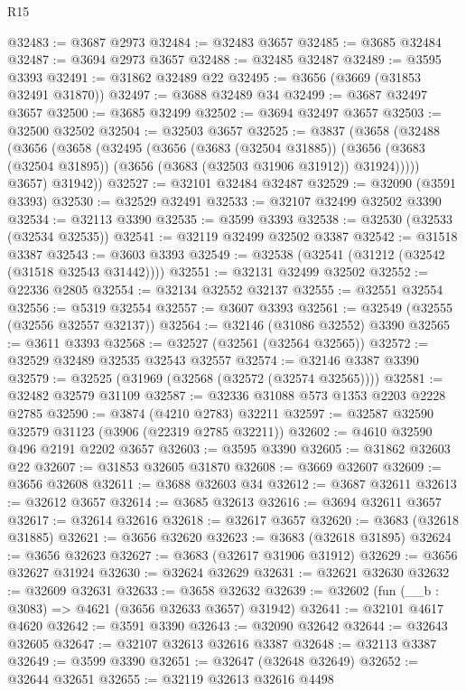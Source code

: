 \begin{lexlean}{R15}
\begin{coremodule}
@32483 := @3687 @2973
@32484 := @32483 @3657
@32485 := @3685 @32484
@32487 := @3694 @2973 @3657
@32488 := @32485 @32487
@32489 := @3595 @3393
@32491 := @31862 @32489 @22
@32495 := @3656 (@3669 (@31853 @32491 @31870))
@32497 := @3688 @32489 @34
@32499 := @3687 @32497 @3657
@32500 := @3685 @32499
@32502 := @3694 @32497 @3657
@32503 := @32500 @32502
@32504 := @32503 @3657
@32525 := @3837
    (@3658
      (@32488
        (@3656
          (@3658
            (@32495
              (@3656
                (@3683 (@32504 @31885))
                (@3656 (@3683 (@32504 @31895)) (@3656 (@3683 (@32503 @31906 @31912)) @31924)))))
          @3657)
        @31942))
@32527 := @32101 @32484 @32487
@32529 := @32090 (@3591 @3393)
@32530 := @32529 @32491
@32533 := @32107 @32499 @32502 @3390
@32534 := @32113 @3390
@32535 := @3599 @3393
@32538 := @32530 (@32533 (@32534 @32535))
@32541 := @32119 @32499 @32502 @3387
@32542 := @31518 @3387
@32543 := @3603 @3393
@32549 := @32538 (@32541 (@31212 (@32542 (@31518 @32543 @31442))))
@32551 := @32131 @32499 @32502
@32552 := @22336 @2805
@32554 := @32134 @32552 @32137
@32555 := @32551 @32554
@32556 := @5319 @32554
@32557 := @3607 @3393
@32561 := @32549 (@32555 (@32556 @32557 @32137))
@32564 := @32146 (@31086 @32552) @3390
@32565 := @3611 @3393
@32568 := @32527 (@32561 (@32564 @32565))
@32572 := @32529 @32489 @32535 @32543 @32557
@32574 := @32146 @3387 @3390
@32579 := @32525 (@31969 (@32568 (@32572 (@32574 @32565))))
@32581 := @32482 @32579 @31109
@32587 := @32336 @31088 @573 @1353 @2203 @2228 @2785
@32590 := @3874 (@4210 @2783) @32211
@32597 := @32587 @32590 @32579 @31123 (@3906 (@22319 @2785 @32211))
@32602 := @4610 @32590 @496 @2191 @2202 @3657
@32603 := @3595 @3390
@32605 := @31862 @32603 @22
@32607 := @31853 @32605 @31870
@32608 := @3669 @32607
@32609 := @3656 @32608
@32611 := @3688 @32603 @34
@32612 := @3687 @32611
@32613 := @32612 @3657
@32614 := @3685 @32613
@32616 := @3694 @32611 @3657
@32617 := @32614 @32616
@32618 := @32617 @3657
@32620 := @3683 (@32618 @31885)
@32621 := @3656 @32620
@32623 := @3683 (@32618 @31895)
@32624 := @3656 @32623
@32627 := @3683 (@32617 @31906 @31912)
@32629 := @3656 @32627 @31924
@32630 := @32624 @32629
@32631 := @32621 @32630
@32632 := @32609 @32631
@32633 := @3658 @32632
@32639 := @32602 (fun (__b : @3083) => @4621 (@3656 @32633 @3657) @31942)
@32641 := @32101 @4617 @4620
@32642 := @3591 @3390
@32643 := @32090 @32642
@32644 := @32643 @32605
@32647 := @32107 @32613 @32616 @3387
@32648 := @32113 @3387
@32649 := @3599 @3390
@32651 := @32647 (@32648 @32649)
@32652 := @32644 @32651
@32655 := @32119 @32613 @32616 @4498

\end{coremodule}
\end{lexlean}
